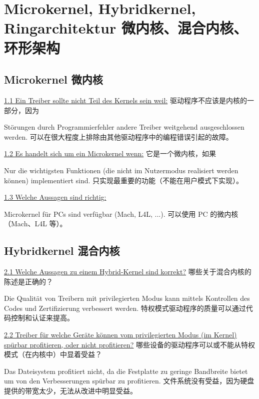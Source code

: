 \documentclass[fleqn]{article}
\begin{document}

\section{Microkernel, Hybridkernel, Ringarchitektur 微内核、混合内核、环形架构}

\subsection{Microkernel 微内核}

\noindent\uline{1.1	Ein Treiber sollte nicht Teil des Kernels sein weil:}
驱动程序不应该是内核的一部分，因为

Störungen durch Programmierfehler andere Treiber weitgehend ausgeschlossen werden.
可以在很大程度上排除由其他驱动程序中的编程错误引起的故障。

\noindent\uline{1.2 Es handelt sich um ein Microkernel wenn:}
它是一个微内核，如果

Nur die wichtigsten Funktionen (die nicht im Nutzermodus realisiert werden können) implementiert sind.
只实现最重要的功能（不能在用户模式下实现）。

\noindent\uline{1.3 Welche Aussagen sind richtig:}

Microkernel für PCs sind verfügbar (Mach, L4L, ...).
可以使用 PC 的微内核（Mach、L4L 等）。


\subsection{Hybridkernel 混合内核}

\noindent\uline{2.1 Welche Aussagen zu einem Hybrid-Kernel sind korrekt?}
哪些关于混合内核的陈述是正确的？

Die Qualität von Treibern mit privilegierten Modus kann mittels Kontrollen des Codes und Zertifizierung verbessert werden.
特权模式驱动程序的质量可以通过代码控制和认证来提高。

\noindent\uline{2.2 Treiber für welche Geräte können vom privilegierten Modus (im Kernel) spürbar profitieren, oder nicht profitieren?}
哪些设备的驱动程序可以或不能从特权模式（在内核中）中显着受益？

Das Dateisystem profitiert nicht, da die Festplatte zu geringe Bandbreite bietet um von den Verbesserungen spürbar zu profitieren.
文件系统没有受益，因为硬盘提供的带宽太少，无法从改进中明显受益。
	
\end{document}
